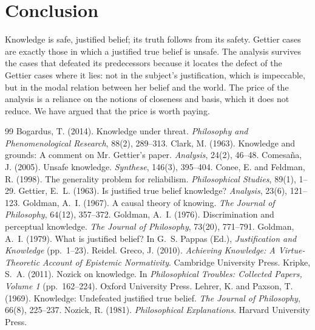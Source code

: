 \documentclass{situationist-preprint}
\begin{document}
\section{Conclusion}

Knowledge is safe, justified belief; its truth follows from its safety. Gettier cases are exactly those in which a justified true belief is unsafe. The analysis survives the cases that defeated its predecessors because it locates the defect of the Gettier cases where it lies: not in the subject's justification, which is impeccable, but in the modal relation between her belief and the world. The price of the analysis is a reliance on the notions of closeness and basis, which it does not reduce. We have argued that the price is worth paying.

\begin{thebibliography}{99}\small
{} Bogardus, T. (2014). Knowledge under threat. \emph{Philosophy and Phenomenological Research}, 88(2), 289--313.
 Clark, M. (1963). Knowledge and grounds: A comment on Mr. Gettier's paper. \emph{Analysis}, 24(2), 46--48.
 Comesa{\~n}a, J. (2005). Unsafe knowledge. \emph{Synthese}, 146(3), 395--404.
 Conee, E. and Feldman, R. (1998). The generality problem for reliabilism. \emph{Philosophical Studies}, 89(1), 1--29.
 Gettier, E.~L. (1963). Is justified true belief knowledge? \emph{Analysis}, 23(6), 121--123.
 Goldman, A.~I. (1967). A causal theory of knowing. \emph{The Journal of Philosophy}, 64(12), 357--372.
 Goldman, A.~I. (1976). Discrimination and perceptual knowledge. \emph{The Journal of Philosophy}, 73(20), 771--791.
 Goldman, A.~I. (1979). What is justified belief? In G.~S. Pappas (Ed.), \emph{Justification and Knowledge} (pp.~1--23). Reidel.
 Greco, J. (2010). \emph{Achieving Knowledge: A Virtue-Theoretic Account of Epistemic Normativity}. Cambridge University Press.
 Kripke, S.~A. (2011). Nozick on knowledge. In \emph{Philosophical Troubles: Collected Papers, Volume 1} (pp.~162--224). Oxford University Press.
 Lehrer, K. and Paxson, T. (1969). Knowledge: Undefeated justified true belief. \emph{The Journal of Philosophy}, 66(8), 225--237.
 Nozick, R. (1981). \emph{Philosophical Explanations}. Harvard University Press.

\end{thebibliography}
\end{document}
